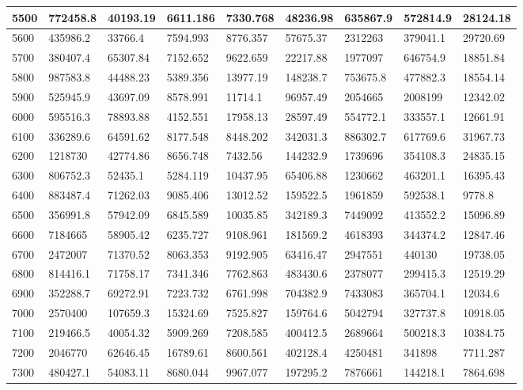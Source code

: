 \begin{table}[]
{\begin{tabular}{|l|l|l|l|l|l|l|l|l|}
5500 & 772458.8 & 40193.19 & 6611.186 & 7330.768 & 48236.98 & 635867.9 & 572814.9 & 28124.18 \\ \hline
5600 & 435986.2 & 33766.4 & 7594.993 & 8776.357 & 57675.37 & 2312263 & 379041.1 & 29720.69 \\ \hline
5700 & 380407.4 & 65307.84 & 7152.652 & 9622.659 & 22217.88 & 1977097 & 646754.9 & 18851.84 \\ \hline
5800 & 987583.8 & 44488.23 & 5389.356 & 13977.19 & 148238.7 & 753675.8 & 477882.3 & 18554.14 \\ \hline
5900 & 525945.9 & 43697.09 & 8578.991 & 11714.1 & 96957.49 & 2054665 & 2008199 & 12342.02 \\ \hline
6000 & 595516.3 & 78893.88 & 4152.551 & 17958.13 & 28597.49 & 554772.1 & 333557.1 & 12661.91 \\ \hline
6100 & 336289.6 & 64591.62 & 8177.548 & 8448.202 & 342031.3 & 886302.7 & 617769.6 & 31967.73 \\ \hline
6200 & 1218730 & 42774.86 & 8656.748 & 7432.56 & 144232.9 & 1739696 & 354108.3 & 24835.15 \\ \hline
6300 & 806752.3 & 52435.1 & 5284.119 & 10437.95 & 65406.88 & 1230662 & 463201.1 & 16395.43 \\ \hline
6400 & 883487.4 & 71262.03 & 9085.406 & 13012.52 & 159522.5 & 1961859 & 592538.1 & 9778.8 \\ \hline
6500 & 356991.8 & 57942.09 & 6845.589 & 10035.85 & 342189.3 & 7449092 & 413552.2 & 15096.89 \\ \hline
6600 & 7184665 & 58905.42 & 6235.727 & 9108.961 & 181569.2 & 4618393 & 344374.2 & 12847.46 \\ \hline
6700 & 2472007 & 71370.52 & 8063.353 & 9192.905 & 63416.47 & 2947551 & 440130 & 19738.05 \\ \hline
6800 & 814416.1 & 71758.17 & 7341.346 & 7762.863 & 483430.6 & 2378077 & 299415.3 & 12519.29 \\ \hline
6900 & 352288.7 & 69272.91 & 7223.732 & 6761.998 & 704382.9 & 7433083 & 365704.1 & 12034.6 \\ \hline
7000 & 2570400 & 107659.3 & 15324.69 & 7525.827 & 159764.6 & 5042794 & 327737.8 & 10918.05 \\ \hline
7100 & 219466.5 & 40054.32 & 5909.269 & 7208.585 & 400412.5 & 2689664 & 500218.3 & 10384.75 \\ \hline
7200 & 2046770 & 62646.45 & 16789.61 & 8600.561 & 402128.4 & 4250481 & 341898 & 7711.287 \\
7300 & 480427.1 & 54083.11 & 8680.044 & 9967.077 & 197295.2 & 7876661 & 144218.1 & 7864.698 \\

\end{tabular}}
\end{table}
